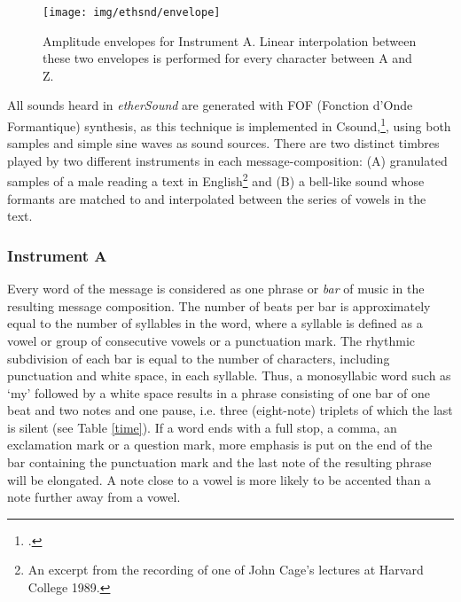 \begin{figure}[!hbp]
  \centering
  \texttt{[image: img/ethsnd/envelope]}
  \caption[Amplitude envelopes for \emph{etherSound}: Instrument A.]{Amplitude envelopes for Instrument A. Linear interpolation
    between these two envelopes is performed for every character
    between A and Z.}
  \label{fig:envelope}
\end{figure}

All sounds heard in \emph{etherSound} are generated with FOF (Fonction d'Onde Formantique) synthesis, as this technique is implemented in Csound,\footcite{fof,fof2}, using both samples and simple sine waves as sound sources. There are two distinct timbres played by two different instruments in each message-composition: (A) granulated samples of a male reading a text in English\footnote{An excerpt from the recording of one of John Cage's lectures at Harvard College 1989.} and (B) a bell-like sound whose formants are matched to and interpolated between the series of vowels in the text.  

\subsubsection{Instrument A} Every word of the message is considered as one phrase or \emph{bar} of music in the resulting message composition. The number of beats per bar is approximately equal to the number of syllables in the word, where a syllable is defined as a vowel or group of consecutive vowels or a punctuation mark. The rhythmic subdivision of each bar is equal to the number of characters, including punctuation and white space, in each syllable. Thus, a monosyllabic word such as `my' followed by a white space results in a phrase consisting of one bar of one beat and two notes and one pause, i.e. three (eight-note) triplets of which the last is silent (see Table \ref{time}). If a word ends with a full stop, a comma, an exclamation mark or a question mark, more emphasis is put on the end of the bar containing the punctuation mark and the last note of the resulting phrase will be elongated. A note close to a vowel is more likely to be accented than a note further away from a vowel. 

